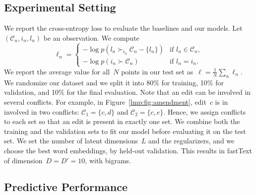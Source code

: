 \subsection{Experimental Setting}

We report the cross-entropy loss to evaluate the baselines and our models.
Let~$( \mathcal{C}_n, i_n, l_n )$ be an observation.
We compute
\begin{equation}
	\ell_n = \begin{cases}
		-\log p(l_n \succ_{i_n} \mathcal{C}_n - \{l_n\} ) & \text{if $l_n \in \mathcal{C}_n$}, \\
		-\log p(i_n \succ \mathcal{C}_n)                  & \text{if $l_n = i_n$}.
	\end{cases}
\end{equation}
We report the average value for all~$N$ points in our test set as~$\ell = \frac{1}{N} \sum_n \ell_n$.
We randomize our dataset and we split it into 80\% for training, 10\% for validation, and 10\% for the final evaluation.
Note that an edit can be involved in several conflicts.
For example, in Figure~\ref{lmp:fig:amendment}, edit~$c$ is in involved in two conflicts: $\mathcal{C}_1 = \{ c, d \}$ and $\mathcal{C}_2 = \{ c, e \}$.
Hence, we assign conflicts to each set so that an edit is present in exactly one set.
We combine both the training and the validation sets to fit our model before evaluating it on the test set.
We set the number of latent dimensions~$L$ and the regularizers, and we choose the best word embeddings, by held-out validation.
This results in fastText of dimension~$D = D' = 10$, with bigrams.

\subsection{Predictive Performance}

